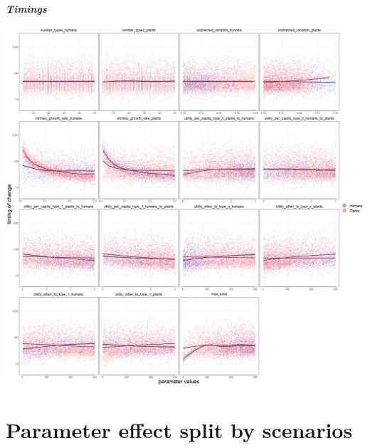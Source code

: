 \documentclass[
]{book}
\begin{document}
\textbf{\emph{Timings}}

\includegraphics[width=1\linewidth]{plots/5_LHS_timing_bifurcationPlot_twoVariables_per_parameter}

\newpage

\hypertarget{parameter-effect-split-by-scenarios}{%
\section{Parameter effect split by scenarios}\label{parameter-effect-split-by-scenarios}}
\end{document}
